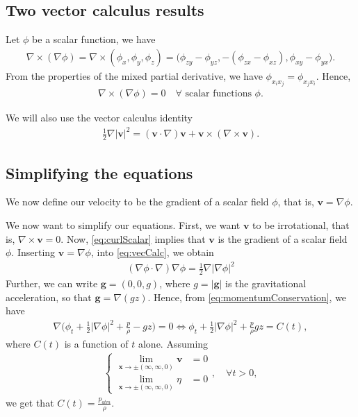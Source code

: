 \documentclass[12pt]{article}
\begin{document}
\subsection{Two vector calculus results}

Let $\phi$ be a scalar function, we have
\begin{align*}
    \nabla \times (\nabla \phi) = \nabla \times (\phi_x, \phi_y, \phi_z) =
        \big(\phi_{zy} - \phi_{yz}, -(\phi_{zx} - \phi_{xz}), \phi_{xy} - \phi_{yx} \big).
\end{align*}
From the properties of the mixed partial derivative, we have $\phi_{x_i x_j} = \phi_{x_j x_i}$. Hence,
\begin{align}
    \label{eq:curlScalar}
    \nabla \times (\nabla \phi) = 0 \quad \forall \text{ scalar functions } \phi.
\end{align}

We will also use the vector calculus identity
\begin{align}
    \label{eq:vecCalc}
    \frac{1}{2}\nabla |\bm{v}|^2 = (\bm{v}\cdot \nabla) \bm{v} + \bm{v} \times (\nabla \times \bm{v}).
\end{align}
%
%
\subsection{Simplifying the equations}
We now define our velocity to be the gradient of a scalar field $\phi$, that is, $\bm{v} = \nabla \phi$.

We now want to simplify our equations. First, we want $\bm{v}$ to be irrotational, that is,
$\nabla \times \bm{v} = 0$. Now, \eqref{eq:curlScalar} implies that $\bm{v}$ is the gradient of a scalar field
$\phi$. Inserting $\bm{v} = \nabla \phi$, into \eqref{eq:vecCalc}, we obtain
\begin{align*}
    (\nabla \phi \cdot \nabla) \nabla \phi = \frac{1}{2}\nabla |\nabla \phi|^2
\end{align*}
Further, we can write $\bm{g} = (0,0,g)$, where $g = |\bm{g}|$ is the gravitational acceleration, so that
$\bm{g} = \nabla (gz)$. Hence, from \eqref{eq:momentumConservation}, we have
\begin{align*}
    \nabla\bigg(\phi_t + \frac{1}{2}|\nabla \phi|^2 + \frac{p}{\rho} - g z \bigg) = 0
    \iff \phi_t + \frac{1}{2}|\nabla \phi|^2 + \frac{p}{\rho}  g z = C(t),
\end{align*}
where $C(t)$ is a function of $t$ alone. Assuming 
\begin{align*}
    \begin{cases}
	    \lim_{\bm{x} \rightarrow \pm(\infty,\infty, 0)}\bm{v} & = 0 \\
	    \lim_{\bm{x} \rightarrow \pm(\infty,\infty, 0)}\eta   & = 0
	\end{cases}, \quad \forall t > 0,
\end{align*}
we get that $C(t) = \frac{p_{atm}}{\rho}$.
\end{document}

